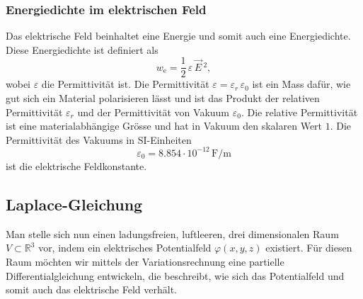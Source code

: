 \subsubsection{Energiedichte im elektrischen Feld}
Das elektrische Feld beinhaltet eine Energie und somit auch eine Energiedichte.
Diese Energiedichte ist definiert als
\begin{equation}
w_{\text{e}}
=
\frac{1}{2}\,\varepsilon\,\vec{E}\,^2,
\label{maxwell:section:definiton_energiedichte_elektrischesFeld}
\end{equation}
wobei $\varepsilon$ die Permittivität ist.
Die Permittivität
\(
\varepsilon
=
\varepsilon_r\,\varepsilon_0
\)
ist ein Mass dafür, wie gut sich ein Material polarisieren lässt und ist das Produkt der relativen Permittivität $\varepsilon_r$ und der Permittivität von Vakuum $\varepsilon_0$.
Die relative Permittivität ist eine materialabhängige Grösse und hat in Vakuum den skalaren Wert $1$.
Die Permittivität des Vakuums in SI-Einheiten
\[
\varepsilon_0
=
8.854 \cdot 10^{-12}\,\text{F/m}
\]
ist die elektrische Feldkonstante.

\subsection{Laplace-Gleichung
	\label{maxwell:section:elektrostatik_ohne_quelle}}
Man stelle sich nun einen ladungsfreien, luftleeren, drei dimensionalen Raum $V\subset\mathbb{R}^3$
vor, indem ein elektrisches Potentialfeld $\varphi(x,y,z)$ existiert.
Für diesen Raum möchten wir mittels der Variationsrechnung eine partielle Differentialgleichung entwickeln, die beschreibt, wie sich das Potentialfeld und somit auch das elektrische Feld verhält. 

